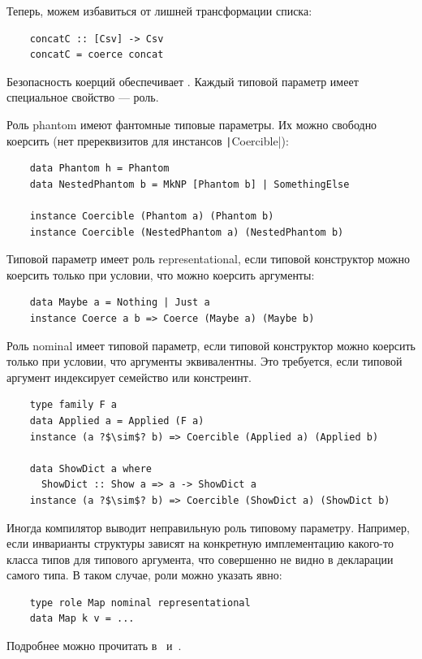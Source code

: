 Теперь, можем избавиться от лишней трансформации списка:
\begin{verbatim}
    concatC :: [Csv] -> Csv
    concatC = coerce concat
\end{verbatim}

Безопасность коерций обеспечивает .
Каждый типовой параметр имеет специальное свойство --- роль.

Роль phantom имеют фантомные типовые параметры.
Их можно свободно коерсить (нет пререквизитов для инстансов \texttt|Coercible|):
\begin{verbatim}
    data Phantom h = Phantom
    data NestedPhantom b = MkNP [Phantom b] | SomethingElse

    instance Coercible (Phantom a) (Phantom b)
    instance Coercible (NestedPhantom a) (NestedPhantom b)
\end{verbatim}

Типовой параметр имеет роль representational, если типовой конструктор можно коерсить только при условии, что можно коерсить аргументы:
\begin{verbatim}
    data Maybe a = Nothing | Just a
    instance Coerce a b => Coerce (Maybe a) (Maybe b)
\end{verbatim}

Роль nominal имеет типовой параметр, если типовой конструктор можно коерсить только при условии, что аргументы эквивалентны.
Это требуется, если типовой аргумент индексирует семейство или констреинт.
\begin{verbatim}
    type family F a
    data Applied a = Applied (F a)
    instance (a ?$\sim$? b) => Coercible (Applied a) (Applied b)

    data ShowDict a where
      ShowDict :: Show a => a -> ShowDict a
    instance (a ?$\sim$? b) => Coercible (ShowDict a) (ShowDict b)
\end{verbatim}

Иногда компилятор выводит неправильную роль типовому параметру.
Например, если инварианты структуры зависят на конкретную имплементацию какого-то класса типов для типового аргумента, что совершенно не видно в декларации самого типа.
В таком случае, роли можно указать явно:
\begin{verbatim}
    type role Map nominal representational
    data Map k v = ...
\end{verbatim}

Подробнее можно прочитать в~\cite{breitner2014safe} и~\cite[глава 8]{maguire-types}.

